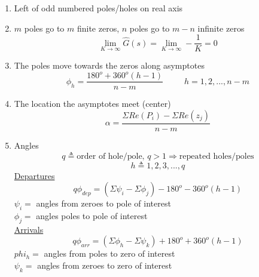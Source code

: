 \documentclass[twocolumn, 12pt]{article}    %
\begin{document}
    \begin{enumerate}
        \item Left of odd numbered poles/holes on real axis
        \item \(m\) poles go to \(m\) finite zeros, \(n\) poles go to \(m-n\) infinite zeros
            \begin{equation*}
                \lim_{K \to \infty} \hat{G}(s) = \lim_{K \to \infty} - \frac{1}{K} = 0
            \end{equation*}
        \item The poles move towards the zeros along asymptotes 
            \begin{equation*}
                \phi_h = \frac{180^o + 360^o (h-1)}{n-m} \hspace{30pt} h = 1,2,...,n-m
            \end{equation*}
        \item The location the asymptotes meet (center)
            \begin{equation*}
                \alpha = \frac{\Sigma Re(P_i) - \Sigma Re(z_j)}{n-m}    
            \end{equation*}
            
        \item Angles 
            \begin{equation*}
                q \triangleq \text{order of hole/pole,    } q>1 \Rightarrow \text{repeated holes/poles}
            \end{equation*}
            \begin{equation*}
                h \triangleq 1,2,3,...,q
            \end{equation*}
        \underline{Departures}
        \begin{equation*}
            q\phi_{dep} = (\Sigma \psi_i -\Sigma \phi_j) - 180^o - 360^o(h-1)
        \end{equation*}
        \(\psi_i=\) angles from zeroes to pole of interest\\
        \(\phi_j=\) angles poles to pole of interest\\
        
        \vspace{10pt}    
        \underline{Arrivals} 
        \begin{equation*}
            q\phi_{arr} = (\Sigma\phi_h -\Sigma\psi_k) + 180^o +360^o(h-1)
        \end{equation*}
        \(phi_h=\) angles from poles to zero of interest\\
        \(\psi_k=\) angles from zeroes to zero of interest\\
        

\end{enumerate}
\end{document}
